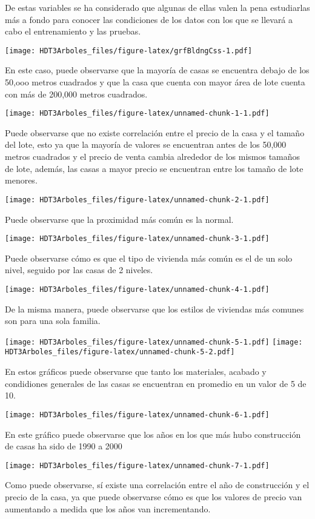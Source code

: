 \documentclass[
]{article}
\begin{document}
De estas variables se ha considerado que algunas de ellas valen la pena
estudiarlas más a fondo para conocer las condiciones de los datos con
los que se llevará a cabo el entrenamiento y las pruebas.

\texttt{[image: HDT3Arboles\_files/figure-latex/grfBldngCss-1.pdf]}

En este caso, puede observarse que la mayoría de casas se encuentra
debajo de los 50,ooo metros cuadrados y que la casa que cuenta con mayor
área de lote cuenta con más de 200,000 metros cuadrados.

\texttt{[image: HDT3Arboles\_files/figure-latex/unnamed-chunk-1-1.pdf]}

Puede observarse que no existe correlación entre el precio de la casa y
el tamaño del lote, esto ya que la mayoría de valores se encuentran
antes de los 50,000 metros cuadrados y el precio de venta cambia
alrededor de los mismos tamaños de lote, además, las casas a mayor
precio se encuentran entre los tamaño de lote menores.

\texttt{[image: HDT3Arboles\_files/figure-latex/unnamed-chunk-2-1.pdf]}

Puede observarse que la proximidad más común es la normal.

\texttt{[image: HDT3Arboles\_files/figure-latex/unnamed-chunk-3-1.pdf]}

Puede observarse cómo es que el tipo de vivienda más común es el de un
solo nivel, seguido por las casas de 2 niveles.

\texttt{[image: HDT3Arboles\_files/figure-latex/unnamed-chunk-4-1.pdf]}

De la misma manera, puede observarse que los estilos de viviendas más
comunes son para una sola familia.

\texttt{[image: HDT3Arboles\_files/figure-latex/unnamed-chunk-5-1.pdf]}
\texttt{[image: HDT3Arboles\_files/figure-latex/unnamed-chunk-5-2.pdf]}

En estos gráficos puede observarse que tanto los materiales, acabado y
condidiones generales de las casas se encuentran en promedio en un valor
de 5 de 10.

\texttt{[image: HDT3Arboles\_files/figure-latex/unnamed-chunk-6-1.pdf]}

En este gráfico puede observarse que los años en los que más hubo
construcción de casas ha sido de 1990 a 2000

\texttt{[image: HDT3Arboles\_files/figure-latex/unnamed-chunk-7-1.pdf]}

Como puede observarse, sí existe una correlación entre el año de
construcción y el precio de la casa, ya que puede observarse cómo es que
los valores de precio van aumentando a medida que los años van
incrementando.
\end{document}
